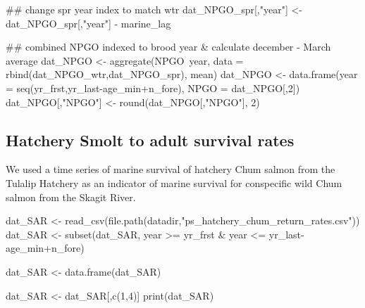 \documentclass[11pt,]{article}
\newenvironment{Shaded}{}{}
\newcommand{\KeywordTok}[1]{\textcolor[rgb]{0.00,0.00,1.00}{#1}}
\newcommand{\DataTypeTok}[1]{#1}
\newcommand{\DecValTok}[1]{#1}
\newcommand{\StringTok}[1]{\textcolor[rgb]{0.00,0.50,0.50}{#1}}
\newcommand{\OperatorTok}[1]{#1}
\newcommand{\NormalTok}[1]{#1}
\begin{document}
\begin{Shaded}
\begin{Highlighting}[]
\NormalTok{## change spr year index to match wtr}
\NormalTok{dat_NPGO_spr[,}\StringTok{"year"}\NormalTok{] <-}\StringTok{ }\NormalTok{dat_NPGO_spr[,}\StringTok{"year"}\NormalTok{] }\OperatorTok{-}\StringTok{ }\NormalTok{marine_lag}

\NormalTok{## combined NPGO indexed to brood year & calculate december - March average}
\NormalTok{dat_NPGO <-}\StringTok{ }\KeywordTok{aggregate}\NormalTok{(NPGO}\OperatorTok{~}\NormalTok{year, }\DataTypeTok{data =} \KeywordTok{rbind}\NormalTok{(dat_NPGO_wtr,dat_NPGO_spr), mean)}
\NormalTok{dat_NPGO <-}\StringTok{ }\KeywordTok{data.frame}\NormalTok{(}\DataTypeTok{year =} \KeywordTok{seq}\NormalTok{(yr_frst,yr_last}\OperatorTok{-}\NormalTok{age_min}\OperatorTok{+}\NormalTok{n_fore),}
                       \DataTypeTok{NPGO =}\NormalTok{ dat_NPGO[,}\DecValTok{2}\NormalTok{])}
\NormalTok{dat_NPGO[,}\StringTok{"NPGO"}\NormalTok{] <-}\StringTok{ }\KeywordTok{round}\NormalTok{(dat_NPGO[,}\StringTok{"NPGO"}\NormalTok{], }\DecValTok{2}\NormalTok{)}
\end{Highlighting}
\end{Shaded}

\subsection{Hatchery Smolt to adult survival
rates}\label{hatchery-smolt-to-adult-survival-rates}

We used a time series of marine survival of hatchery Chum salmon from
the Tulalip Hatchery as an indicator of marine survival for conspecific
wild Chum salmon from the Skagit River.

\begin{Shaded}
\begin{Highlighting}[]
\NormalTok{dat_SAR <-}\StringTok{ }\KeywordTok{read_csv}\NormalTok{(}\KeywordTok{file.path}\NormalTok{(datadir,}\StringTok{"ps_hatchery_chum_return_rates.csv"}\NormalTok{))}
\NormalTok{dat_SAR <-}\StringTok{ }\KeywordTok{subset}\NormalTok{(dat_SAR, year }\OperatorTok{>=}\StringTok{ }\NormalTok{yr_frst}
                   \OperatorTok{&}\StringTok{ }\NormalTok{year }\OperatorTok{<=}\StringTok{ }\NormalTok{yr_last}\OperatorTok{-}\NormalTok{age_min}\OperatorTok{+}\NormalTok{n_fore)}

\NormalTok{dat_SAR <-}\StringTok{ }\KeywordTok{data.frame}\NormalTok{(dat_SAR)}

\NormalTok{dat_SAR <-}\StringTok{ }\NormalTok{dat_SAR[,}\KeywordTok{c}\NormalTok{(}\DecValTok{1}\NormalTok{,}\DecValTok{4}\NormalTok{)]}
\KeywordTok{print}\NormalTok{(dat_SAR)}
\end{Highlighting}
\end{Shaded}
\end{document}
